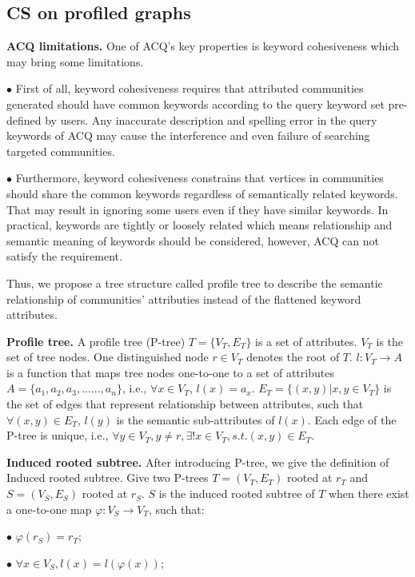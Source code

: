 \subsection{CS on profiled graphs}
\label{PCQ}

{\bf ACQ limitations.}
One of ACQ's key properties is keyword cohesiveness which may bring some limitations. 

$\bullet$ First of all, keyword cohesiveness requires that attributed communities generated should have common keywords according to the query keyword set pre-defined by users. Any inaccurate description and spelling error in the query keywords of ACQ may cause the interference and even failure of searching targeted communities. 

$\bullet$ Furthermore, keyword cohesiveness constrains that vertices in communities should share the common keywords regardless of semantically related keywords. That may result in ignoring some users even if they have similar keywords. In practical, keywords are tightly or loosely related which means relationship and semantic meaning of keywords should be considered, however, ACQ can not satisfy the requirement.

Thus, we propose a tree structure called profile tree to describe the semantic relationship of communities' attributies instead of the flattened keyword attributes.

{\bf Profile tree.} 
A profile tree (P-tree) $T=\{V_T,E_T\}$ is a set of attributes. $V_T$ is the set of tree nodes. One distinguished node $r\in V_T$ denotes the root of $T$. $l:V_T\to A$ is a function that maps tree nodes one-to-one to a set of attributes $A=\{a_1, a_2, a_3, ......, a_n\}$, i.e., $\forall x\in V_T$, $l(x)=a_x$. $E_T=\{(x,y)|x,y\in V_T\}$ is the set of edges that represent relationship between attributes, such that $\forall (x,y)\in E_T$, $l(y)$ is the semantic sub-attributes of $l(x)$. Each edge of the P-tree is unique, i.e., $\forall y \in V_T, y\neq r, \exists !x\in V_T, s.t.(x,y) \in E_T$.

{\bf Induced rooted subtree.}
After introducing P-tree, we give the definition of Induced rooted subtree.
Give two P-trees $T=(V_{T},E_{T})$ rooted at $r_T$ and $S=(V_S,E_S)$ rooted at $r_S$. $S$ is the induced rooted subtree of $T$ when there exist a one-to-one map $\varphi: V_S \to V_T$, such that:

$\bullet$ $\varphi(r_S)=r_T$;

$\bullet$ $ \forall x \in V_S, l(x)=l(\varphi(x))$;

